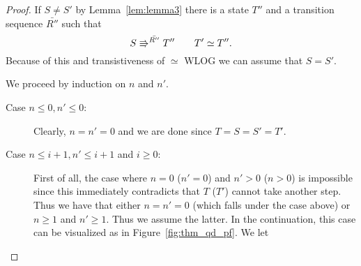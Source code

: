 \begin{proof}
  If $S \neq S'$ by Lemma~\ref{lem:lemma3} there is a state $T''$ and a
  transition sequence $\bar{R''}$ such that
  \begin{equation}
    S \Rrightarrow^{\bar{R''}} T'' \quad\quad T' \simeq T''.
  \end{equation}
  Because of this and transistiveness of $\simeq$ WLOG we can assume that $S =
  S'$.

  We proceed by induction on $n$ and $n'$.
  \begin{description}
    \item[Case $n \leq 0, n' \leq 0$:] Clearly, $n = n' = 0$ and we are done
      since $T = S = S' = T'$. 
      
    \item[Case $n \leq i+1, n' \leq i+1$ and $i \geq 0$:] First of all, the case
      where $n = 0$ ($n' = 0$) and $n' > 0$ ($n > 0$) is impossible since this
      immediately contradicts that $T$ ($T'$) cannot take another step. Thus we
      have that either $n = n' = 0$ (which falls under the case above) or $n
      \geq 1$ and $n' \geq 1$. Thus we assume the latter. In the
      continuation, this case can be visualized as in
      Figure~\ref{fig:thm_qd_pf}. We let 


\end{description}
\end{proof}
